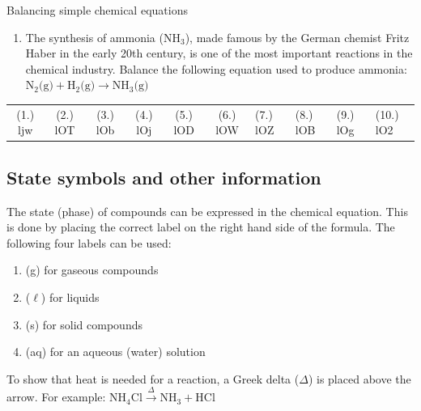 \begin{exercises}{ Balancing simple chemical equations
        }
\begin{enumerate}[noitemsep, label=\textbf{\arabic*}. ]
\item The synthesis of ammonia ($\text{NH}_{3}$), made famous by the German chemist Fritz Haber in the early 20th century, is one of the most important reactions in the chemical industry. Balance the following equation used to produce ammonia:
$\text{N}_{2} \text{(g)} + \text{H}_{2} \text{(g)} \to \text{NH}_{3} \text{(g)}$
\end{enumerate}
\practiceinfo
\par 
 \par \begin{tabular}[h]{cccccc}
 (1.) ljw  &  (2.) lOT   &  (3.) lOb  &  (4.) lOj  &  (5.) lOD  &  (6.) lOW  &  (7.) lOZ  &  (8.) lOB  &  (9.) lOg  &  (10.) lO2  & \end{tabular}
\end{exercises}
         \subsection*{State symbols and other information}
    \nopagebreak
      \label{m38727*id65920}The state (phase) of compounds can be expressed in the chemical equation. This is done by placing the correct label on the right hand side of the formula. The following four labels can be used:\par \noindent 
      \label{m38727*id65925}\begin{enumerate}[noitemsep, label=\textbf{\arabic*}.] 
\item (g) for gaseous compounds
\label{m38727*uid28}\item ($\ell$) for liquids
\label{m38727*uid29}\item (s) for solid compounds
\label{m38727*uid30}\item (aq) for an aqueous (water) solution
\end{enumerate}
\label{m38727*eip-536}To show that heat is needed for a reaction, a Greek delta ($\Delta $) is placed above the arrow. For example: $\text{NH}_{4}\text{Cl} \xrightarrow{\Delta} \text{NH}_{3} + \text{HCl}$ 
